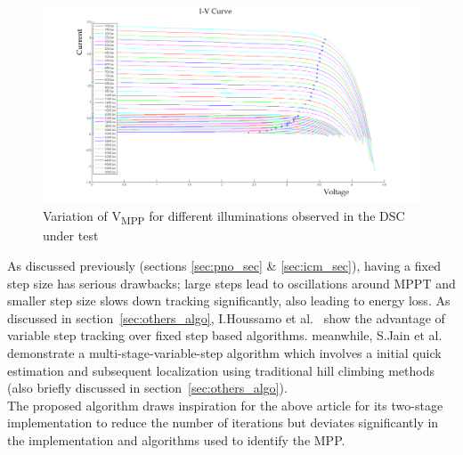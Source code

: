       
 \begin{figure}[H]
   \begin{center}
     \includegraphics[width=1.2\textwidth]{images/IV_50-500}
     \caption{Variation of V\textsubscript{MPP} for different illuminations observed in the DSC under test }
     \label{fig:vmmp_lux50_5000}
   \end{center}
  \end{figure}
   
 
As discussed previously (sections \ref{sec:pno_sec} \& \ref{sec:icm_sec}), having a fixed step size has serious drawbacks; large steps lead to oscillations around \ac{MPPT} and smaller step size slows down tracking significantly, also leading to energy loss. As discussed in section~\ref{sec:others_algo}, I.Houssamo et al.~\cite{houssamo2013experimental} show the advantage of variable step tracking over fixed step based algorithms. meanwhile, S.Jain et al.~\cite{jain2004new} demonstrate a multi-stage-variable-step algorithm which involves a initial quick estimation and subsequent localization using traditional hill climbing methods (also briefly discussed in section~\ref{sec:others_algo}).\\  

 The proposed algorithm draws inspiration for the above article for its two-stage implementation to reduce the number of iterations but deviates significantly in the implementation and algorithms used to identify the \ac{MPP}.\\ 
 

